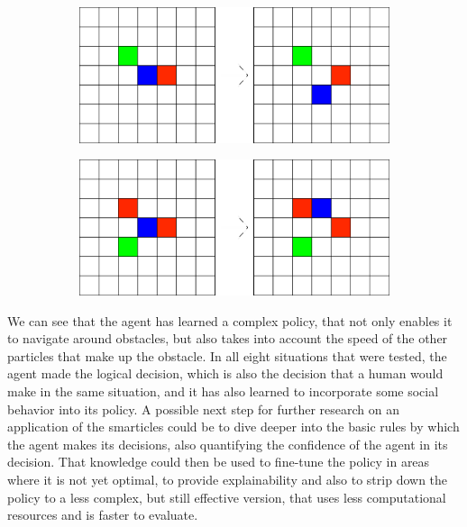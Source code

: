 \begin{figure}[H]\ContinuedFloat
        \begin{subfigure}[T]{0.45\textwidth}
            \centering
            \includegraphics[width=\textwidth]{playground/7.png}
            \label{fig:playground_7}
        \end{subfigure}
        \hfill
        \begin{subfigure}[T]{0.45\textwidth}
            \centering
            \includegraphics[width=\textwidth]{playground/8.png}
            \label{fig:playground_8}
        \end{subfigure}
\end{figure}

We can see that the agent has learned a complex policy, that not only enables it to navigate around obstacles, but also takes into account the speed of the other particles that make up the obstacle. In all eight situations that were tested, the agent made the logical decision, which is also the decision that a human would make in the same situation, and it has also learned to incorporate some social behavior into its policy. A possible next step for further research on an application of the smarticles could be to dive deeper into the basic rules by which the agent makes its decisions, also quantifying the confidence of the agent in its decision. That knowledge could then be used to fine-tune the policy in areas where it is not yet optimal, to provide explainability and also to strip down the policy to a less complex, but still effective version, that uses less computational resources and is faster to evaluate. 

